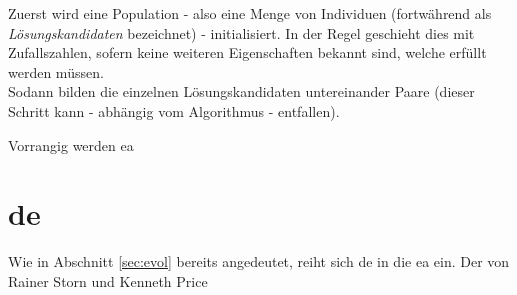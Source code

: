	Zuerst wird eine Population - also eine Menge von Individuen (fortwährend als \textit{Lösungskandidaten} bezeichnet) - i\-ni\-ti\-a\-li\-siert. In der Regel geschieht dies mit Zufallszahlen, sofern keine weiteren Eigenschaften bekannt sind, welche erfüllt werden müssen.\\
	Sodann bilden die einzelnen Lösungskandidaten untereinander Paare (dieser Schritt kann - abhängig vom Algorithmus - entfallen).
	
	
	Vorrangig werden \gls{ea}


	\section{\gls{de}}
	\label{sec:de}

		Wie in Abschnitt \ref{sec:evol} bereits angedeutet, reiht sich \gls{de} in die \gls{ea} ein. Der von Rainer Storn und Kenneth Price \cite{storn-price-de} 